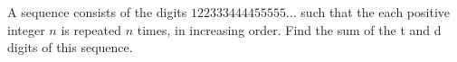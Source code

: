 A sequence consists of the digits $122333444455555\ldots$ such that the each positive integer $n$ is repeated $n$ times, in increasing order. Find the sum of the t and d digits of this sequence.